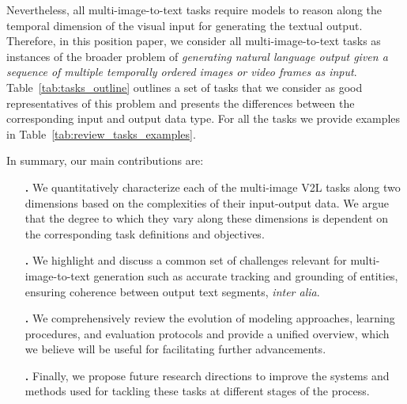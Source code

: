 Nevertheless, all multi-image-to-text tasks require models to reason along the temporal dimension of the visual input for generating the textual output. Therefore, in this position paper, we consider all multi-image-to-text tasks as instances of the broader problem of \textit{generating natural language output given a sequence of multiple temporally ordered images or video frames as input}. Table~\ref{tab:tasks_outline} outlines a set of tasks that we consider as good representatives of this problem and presents the differences between the corresponding input and output data type. For all the tasks we provide examples in Table~\ref{tab:review_tasks_examples}.

In summary, our main contributions are:
\begin{itemize}[noitemsep,topsep=0pt,]
    \item[\textbf{\romannumeral 1.}] We quantitatively characterize each of the multi-image V2L tasks along two dimensions based on the complexities of their input-output data. We argue that the degree to which they vary along these dimensions is dependent on the corresponding task definitions and objectives. 
    \item[\textbf{\romannumeral 2.}] We highlight and discuss a common set of challenges relevant for multi-image-to-text generation such as accurate tracking and grounding of entities, ensuring coherence between output text segments, \textit{inter alia}.
    \item[\textbf{\romannumeral 3.}] We comprehensively review the evolution of modeling approaches, learning procedures, and evaluation protocols and provide a unified overview, which we believe will be useful for facilitating further advancements.
    \item[\textbf{\romannumeral 4.}] Finally, we propose future research directions to improve the systems and methods used for tackling these tasks at different stages of the process.
\end{itemize}